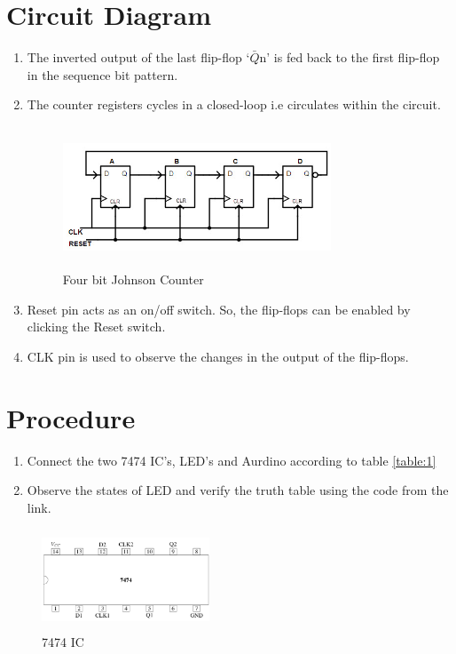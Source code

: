 \documentclass[journal,12pt,twocolumn]{IEEEtran}
\begin{document}
    \vspace{2.5cm}   



\section{Circuit Diagram}
\begin{enumerate}
\item The inverted output of the last flip-flop ‘$\bar{Q}$n’ is fed back to the first flip-flop in the sequence bit pattern. 
\item The counter registers cycles in a closed-loop i.e circulates within the circuit.
\begin{figure}[h]
    \centering
    \includegraphics[width=8cm, height=4.2cm]{counter.jpg}
    
    \caption{Four bit Johnson Counter}

\end{figure}
\item Reset pin acts as an on/off switch. So, the flip-flops can be enabled by clicking the Reset switch.

\item CLK pin is used to observe the changes in the output of the flip-flops.
\end{enumerate}



\section{Procedure}
\begin{enumerate}
\item Connect the two 7474 IC's, LED's and Aurdino according to table \ref{table:1}
\item Observe the states of LED and verify the truth table using the code from the link.



\end{enumerate}

\begin{figure}[h]
\centering
    \includegraphics[width=5cm, height=3cm]{7474.png}
    
    \caption{7474 IC}

\end{figure}
\end{document}
